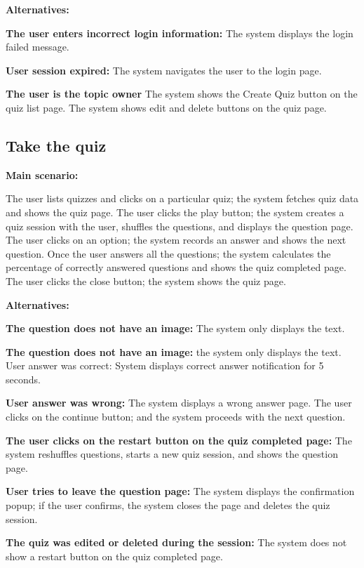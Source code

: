 \documentclass[
    english, %
]{VUMIFPSkursinis}
\begin{document}
\noindent\textbf{\fontsize{13}{15}\selectfont Alternatives:}

\textbf{The user enters incorrect login information:} The system displays the login failed message.

\textbf{User session expired:} The system navigates the user to the login page.

\textbf{The user is the topic owner} The system shows the Create Quiz button on the quiz list page. The system shows edit and delete buttons on the quiz page.

\subsection{Take the quiz}

\noindent\textbf{\fontsize{13}{15}\selectfont Main scenario:}

The user lists quizzes and clicks on a particular quiz; the system fetches quiz data and shows the quiz page. The user clicks the play button; the system creates a quiz session with the user, shuffles the questions, and displays the question page. The user clicks on an option; the system records an answer and shows the next question. Once the user answers all the questions; the system calculates the percentage of correctly answered questions and shows the quiz completed page. The user clicks the close button; the system shows the quiz page.

\noindent\textbf{\fontsize{13}{15}\selectfont Alternatives:}

\textbf{The question does not have an image:} The system only displays the text.

\textbf{The question does not have an image:} the system only displays the text.
User answer was correct: System displays correct answer notification for 5 seconds.

\textbf{User answer was wrong:} The system displays a wrong answer page. The user clicks on the continue button; and the system proceeds with the next question.

\textbf{The user clicks on the restart button on the quiz completed page:} The system reshuffles questions, starts a new quiz session, and shows the question page.

\textbf{User tries to leave the question page:} The system displays the confirmation popup; if the user confirms, the system closes the page and deletes the quiz session.

\textbf{The quiz was edited or deleted during the session:} The system does not show a restart button on the quiz completed page.
\end{document}
